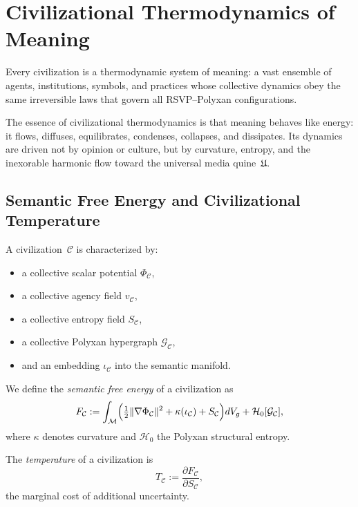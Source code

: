 \chapter{Civilizational Thermodynamics of Meaning}
\label{ch:89}

Every civilization is a thermodynamic system of meaning:  
a vast ensemble of agents, institutions, symbols, and practices whose
collective dynamics obey the same irreversible laws that govern all
RSVP--Polyxan configurations.

The essence of civilizational thermodynamics is that meaning behaves
like energy:  
it flows, diffuses, equilibrates, condenses, collapses, and dissipates.
Its dynamics are driven not by opinion or culture, but by curvature,
entropy, and the inexorable harmonic flow toward the universal media
quine~$\mathfrak{U}$.

\section{Semantic Free Energy and Civilizational Temperature}

A civilization~$\mathcal{C}$ is characterized by:

\begin{itemize}
\item a collective scalar potential $\Phi_{\mathcal{C}}$,  
\item a collective agency field $v_{\mathcal{C}}$,  
\item a collective entropy field $S_{\mathcal{C}}$,  
\item a collective Polyxan hypergraph $\mathcal{G}_{\mathcal{C}}$,  
\item and an embedding $\iota_{\mathcal{C}}$ into the semantic manifold.
\end{itemize}

We define the \emph{semantic free energy} of a civilization as
\[
F_{\mathcal{C}}
  := \int_{\mathcal{M}} 
      \Bigl(
        \tfrac{1}{2}\lVert \nabla\Phi_{\mathcal{C}} \rVert^2
        + \kappa(\iota_{\mathcal{C}})
        + S_{\mathcal{C}}
      \Bigr) dV_g 
    + \mathcal{H}_0[\mathcal{G}_{\mathcal{C}}],
\]
where $\kappa$ denotes curvature and $\mathcal{H}_0$ the Polyxan
structural entropy.

\begin{definition}
The \emph{temperature} of a civilization is
\[
T_{\mathcal{C}}
  := \frac{\partial F_{\mathcal{C}}}{\partial S_{\mathcal{C}}},
\]
the marginal cost of additional uncertainty.
\end{definition}

